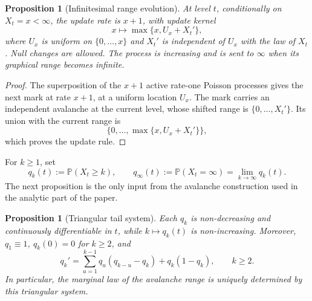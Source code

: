\documentclass[11pt,a4paper]{amsart}
\newtheorem{proposition}[theorem]{Proposition}
\theoremstyle{remark}
\begin{document}
\begin{proposition}[Infinitesimal range evolution]
\label{prop:range-evolution}
At level $t$, conditionally on $X_t=x<\infty$, the update rate is
$x+1$, with update kernel
\begin{equation}
\label{eq:range-update}
        x\longmapsto\max\{x,U_x+X_t'\},
\end{equation}
where $U_x$ is uniform on $\{0,\ldots,x\}$ and $X_t'$ is independent of $U_x$ with the law of $X_t$. Null changes are allowed. The process is increasing and is sent to $\infty$ when its graphical range becomes infinite.
\end{proposition}

\begin{proof}
The superposition of the $x+1$ active rate-one Poisson processes gives the next mark at rate $x+1$, at a uniform location $U_x$. The mark carries an independent avalanche at the current level, whose shifted range is $\{0,\ldots,X_t'\}$. Its union with the current range is
\[
        \{0,\ldots,\max\{x,U_x+X_t'\}\},
\]
which proves the update rule.
\end{proof}

For $k\geq1$, set
\[
        q_k(t):=\mathbb{P}(X_t\geq k),\qquad
        q_\infty(t):=\mathbb{P}(X_t=\infty)=\lim_{k\to\infty}q_k(t).
\]
The next proposition is the only input from the avalanche construction used in the analytic part of the paper.

\begin{proposition}[Triangular tail system]
\label{prop:tail-system}
Each $q_k$ is non-decreasing and continuously differentiable in $t$,
while $k\mapsto q_k(t)$ is non-increasing. Moreover, $q_1\equiv1$,
$q_k(0)=0$ for $k\geq2$, and
\begin{equation}
\label{eq:tail-system}
        q_k'
        =
        \sum_{u=1}^{k-1}q_u(q_{k-u}-q_k)+q_k(1-q_k),
        \qquad k\geq2.
\end{equation}
In particular, the marginal law of the avalanche range is uniquely determined by this triangular system.
\end{proposition}
\end{document}
